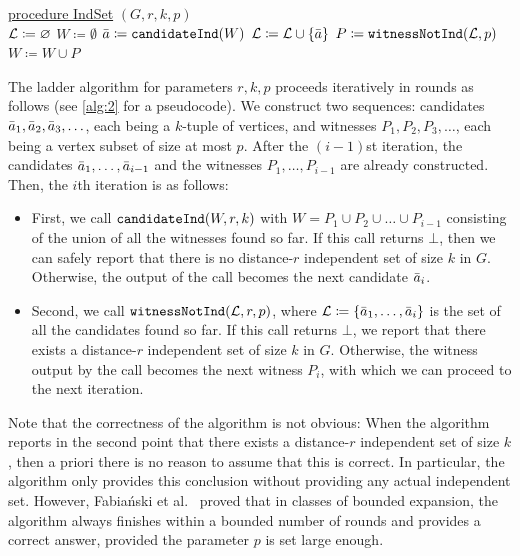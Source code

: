 \begin{algorithm}
	
	\nonl
	\underline{procedure IndSet} $(G,r,k,p)$\\
	\medskip
	${\cal L}\coloneqq \emptyset$\;
	$W \coloneqq \emptyset$\;
	\Repeat
	{
		$\tup a\coloneqq \candidateInd{W}$\;
		{
			 \;
		}
		${\cal L}\coloneqq {\cal L}\cup \{\tup a\}$ \;
		$P \coloneqq \witnessInd{\cal L,p}$ \;
		{
			 \;
		}
		$W \coloneqq W \cup P$ \;
	}
	\caption{Ladder algorithm for distance-$r$ independent set of size $k$ in a graph $G$}\label{alg:2}
\end{algorithm}


The ladder algorithm for parameters $r,k,p$ proceeds iteratively in rounds as follows (see \cref{alg:2} for a pseudocode). We construct two sequences: candidates $\tup a_1,\tup a_2,\tup a_3,\ldots$, each being a $k$-tuple of vertices, and witnesses $P_1,P_2,P_3,\ldots$, each being a vertex subset of size at most $p$. After the $(i-1)$st iteration, the candidates $\tup a_1,\ldots,\tup a_{i-1}$ and the witnesses $P_1,\ldots,P_{i-1}$ are already constructed. Then, the $i$th iteration is as follows:
\begin{itemize}
	\item First, we call $\candidateInd{W,r,k}$ with $W=P_1\cup P_2\cup \ldots \cup P_{i-1}$ consisting of the union of all the witnesses found so far. If this call returns $\bot$, then we can safely report that there is no distance-$r$ independent set of size $k$ in $G$. Otherwise, the output of the call becomes the next candidate $\tup a_i$.
	\item Second, we call $\witnessInd{\cal L,r,p}$, where $\cal L\coloneqq \{\tup a_1,\ldots,\tup a_i\}$ is the set of all the candidates found so far. If this call returns $\bot$, we report that there exists a distance-$r$ independent set of size $k$ in $G$. Otherwise, the witness output by the call becomes the next witness $P_i$, with which we can proceed to the next iteration.
\end{itemize}
Note that the correctness of the algorithm is not obvious: When the algorithm reports in the second point that there exists a distance-$r$ independent set of size $k$, then a priori there is no reason to assume that this is correct. In particular, the algorithm only provides this conclusion without providing any actual independent set. However, Fabia\'nski et al.~\cite{FabianskiPST19,Fabianski2018arxiv} proved that in classes of bounded expansion, the algorithm always finishes within a bounded number of rounds and provides a correct answer, provided the parameter $p$ is set large enough.

